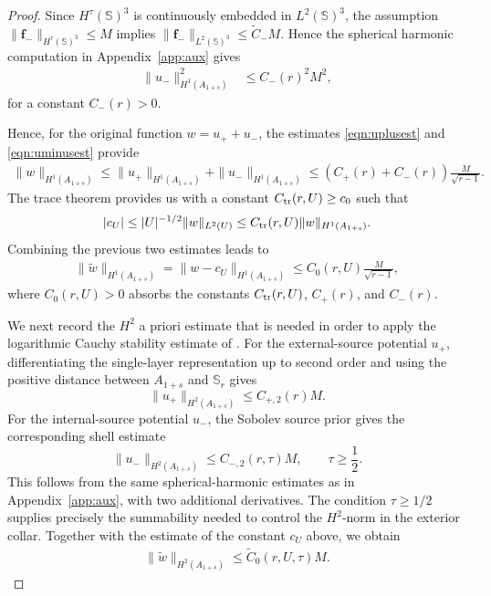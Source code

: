\documentclass[a4paper, 11pt]{article}
\renewcommand{\SS}{\mathbb{S}}
\newcommand{\f}{\mathbf{f}}
\begin{document}
\begin{proof}
    Since $H^\tau(\SS)^3$ is continuously embedded in $ L^2(\SS)^3$, the assumption $\|\f_-\|_{H^\tau(\SS)^3}\le M$ implies $\|\f_-\|_{L^2(\SS)^3}\le \tilde{C}_- M$. Hence the spherical harmonic computation in Appendix~\ref{app:aux}  gives
    \begin{align}
			\|u_-\|_{H^1(A_{1+s})}^2&\leq  C_-(r)^2M^2,\label{eqn:uminusest}
	\end{align}
    for a constant $C_-(r)>0$. 
    
Hence, for the original function \(w=u_++u_-\), the estimates \eqref{eqn:uplusest} and \eqref{eqn:uminusest} provide
	\begin{align}
		\|w\|_{H^1(A_{1+s})}
		\le \|u_+\|_{H^1(A_{1+s})}+\|u_-\|_{H^1(A_{1+s})}
		\le (C_+(r)+C_-(r))\frac{M}{\sqrt{r-1}}.
	\end{align}
	The trace theorem provides us with a constant $C_{\rm tr}(r,U)\geq c_0$ such that
	\[
		|c_U|\le |U|^{-1/2}\|w\|_{L^2(U)}
		\le C_{\rm tr}(r,U)\|w\|_{H^1(A_{1+s})}.
	\]
	Combining the previous two estimates leads to 
	\begin{align}
		\|\widetilde w\|_{H^1(A_{1+s})}=\|w-c_U\|_{H^1(A_{1+s})}
		\le C_0(r,U)\frac{M}{\sqrt{r-1}},\label{eqn:tildewest}
	\end{align}
	where \(C_0(r,U)>0\) absorbs the constants $C_{\rm tr}(r,U)$, \(C_+(r)\), and \(C_-(r)\).


 We next record the $H^2$ a priori estimate that is needed in order to apply the logarithmic Cauchy stability estimate of \cite[Cor.~2.1]{bou10}. For the external-source potential $u_+$, differentiating the single-layer representation up to second order and using the positive distance between $A_{1+s}$ and $\SS_r$ gives
\[
\|u_+\|_{H^2(A_{1+s})}\le C_{+,2}(r)M.
\]
For the internal-source potential $u_-$, the Sobolev source prior gives the
corresponding shell estimate
\[
    \|u_-\|_{H^2(A_{1+s})}\le C_{-,2}(r,\tau)M,
    \qquad \tau\geq\frac12 .
\]
This follows from the same spherical-harmonic estimates as in Appendix~\ref{app:aux},
with two additional derivatives. The condition $\tau\geq1/2$ supplies precisely
the summability needed to control the $H^2$-norm in the exterior collar. Together with the estimate of the constant $c_U$ above, we obtain
\begin{align}
\|\widetilde w\|_{H^2(A_{1+s})}\le \tilde{C}_{0}(r,U,\tau)M.\label{eqn:h2prior-wtilde}
\end{align}


\end{proof}
\end{document}
